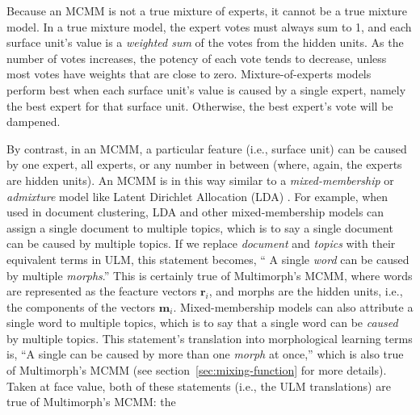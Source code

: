 Because an \ac{MCMM} is not a true mixture of experts, it cannot be a true mixture model. 
In a true mixture model, the expert votes must always sum to 1, and each surface unit's value 
is a \emph{weighted sum} of the votes from the hidden units. As the number of votes increases, 
the potency of each vote tends to decrease, unless most votes have weights that are close to zero. 
Mixture-of-experts models perform best when each surface unit's value is caused by a single 
expert, namely the best expert for that surface unit. Otherwise, the best expert's vote will be 
dampened. 

By contrast, in an \ac{MCMM}, a particular feature (i.e., surface unit) can be caused 
by one expert, all experts, or any number in between (where, again, the experts are hidden units).
An \ac{MCMM} is in this way similar to a \emph{mixed-membership} or \emph{admixture} model like 
Latent Dirichlet Allocation (LDA) \citep{blei-et-al:2003}. For example, 
when used in document clustering, LDA and other mixed-membership models
can assign a single document to multiple topics, which is to say a single document can be caused by multiple topics. If we replace \emph{document} and \emph{topics} with their equivalent terms in ULM, this statement becomes, `` 
A single \emph{word} can be caused by multiple \emph{morphs}.'' This is certainly true of Multimorph's MCMM, where words are represented as the feacture vectors $\textbf{r}_i$, and morphs are the hidden units, i.e., the components of the vectors $\textbf{m}_i$.
Mixed-membership models can also attribute a single word to multiple topics, which is to say that a single word can be \emph{caused} by multiple topics. This statement's translation into morphological learning terms is,
``A single  can be caused by more than one \emph{morph} at once,'' which is also true of Multimorph's MCMM (see section~\ref{sec:mixing-function} for more details).
Taken at face value, both of these statements (i.e., the ULM translations) are true of Multimorph's MCMM: the 
